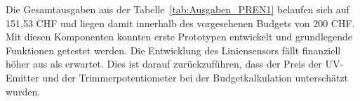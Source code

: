 \documentclass[main.tex]{subfiles} %
\begin{document}
Die Gesamtausgaben aus der Tabelle~\ref{tab:Ausgaben_PREN1} belaufen sich auf 151,53 CHF und liegen
damit innerhalb des vorgesehenen Budgets von 200 CHF. Mit diesen Komponenten 
konnten erste Prototypen entwickelt und grundlegende Funktionen getestet werden. Die Entwicklung 
des Liniensensors fällt finanziell höher aus als erwartet. Dies ist darauf zurückzuführen, dass der
Preis der UV-Emitter und der Trimmerpotentiometer bei der Budgetkalkulation unterschätzt wurden.
\end{document}
